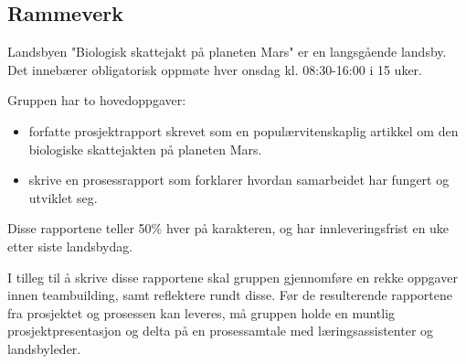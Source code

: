 \subsection{Rammeverk}

Landsbyen "Biologisk skattejakt på planeten Mars" er en langsgående landsby.
Det innebærer obligatorisk oppmøte hver onsdag kl. 08:30-16:00 i 15 uker.

Gruppen har to hovedoppgaver:
\begin{itemize}
\item forfatte prosjektrapport skrevet som en populærvitenskaplig artikkel om den biologiske skattejakten på planeten Mars.
\item skrive en prosessrapport som forklarer hvordan samarbeidet har fungert og utviklet seg.
\end{itemize}
Disse rapportene teller 50\% hver på karakteren, og har innleveringsfrist en uke etter siste landsbydag.

I tilleg til å skrive disse rapportene skal gruppen gjennomføre en rekke oppgaver innen teambuilding, samt reflektere rundt disse.
Før de resulterende rapportene fra prosjektet og prosessen kan leveres, må gruppen holde en muntlig prosjektpresentasjon og delta på en prosessamtale med læringsassistenter og landsbyleder. 
